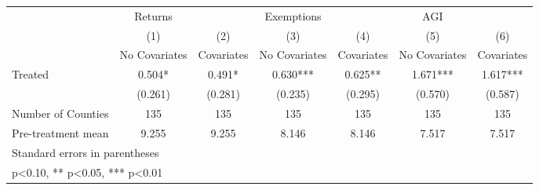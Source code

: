 {
\def\sym#1{\ifmmode^{#1}\else\(^{#1}\)\fi}
\begin{tabular}{l*{6}{c}}
\hline\hline
            &     Returns   &               &  Exemptions   &               &         AGI   &               \\
            &\multicolumn{1}{c}{(1)}&\multicolumn{1}{c}{(2)}&\multicolumn{1}{c}{(3)}&\multicolumn{1}{c}{(4)}&\multicolumn{1}{c}{(5)}&\multicolumn{1}{c}{(6)}\\
            &\multicolumn{1}{c}{No Covariates}&\multicolumn{1}{c}{Covariates}&\multicolumn{1}{c}{No Covariates}&\multicolumn{1}{c}{Covariates}&\multicolumn{1}{c}{No Covariates}&\multicolumn{1}{c}{Covariates}\\
\hline
Treated     &       0.504*  &       0.491*  &       0.630***&       0.625** &       1.671***&       1.617***\\
            &     (0.261)   &     (0.281)   &     (0.235)   &     (0.295)   &     (0.570)   &     (0.587)   \\
\hline
Number of Counties&         135   &         135   &         135   &         135   &         135   &         135   \\
Pre-treatment mean&       9.255   &       9.255   &       8.146   &       8.146   &       7.517   &       7.517   \\
\hline\hline
\multicolumn{7}{l}{\footnotesize Standard errors in parentheses}\\
\multicolumn{7}{l}{\footnotesize * p<0.10, ** p<0.05, *** p<0.01}\\
\end{tabular}
}
